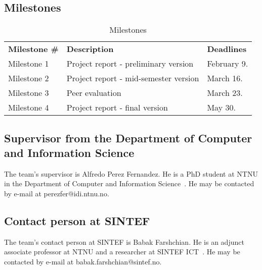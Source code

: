 \subsection{Milestones}
\begin{table}[H]
\centering
{}
\begin{tabular}{|l|l|l|}
\hline
\textbf{Milestone \#} & \textbf{Description} & \textbf{Deadlines}\\
Milestone 1& Project report - preliminary version & February 9. \\
Milestone 2 & Project report - mid-semester version & March 16.  \\
Milestone 3 & Peer evaluation & March 23.  \\
 Milestone 4 & Project report - final version & May 30.\\\hline
\end{tabular}
\caption{Milestones}
\end{table}

\subsection{Supervisor from the Department of Computer and Information Science}
The team's supervisor is Alfredo Perez Fernandez. He is a PhD student at NTNU in the Department of Computer and Information Science~\cite{idi}. He may be contacted by e-mail at perezfer@idi.ntnu.no.

\subsection{Contact person at SINTEF}
The team's contact person at SINTEF is Babak Farshchian. He is an adjunct associate professor at NTNU and a researcher at SINTEF ICT~\cite{sintefict}. He may be contacted by e-mail at babak.farshchian@sintef.no.
